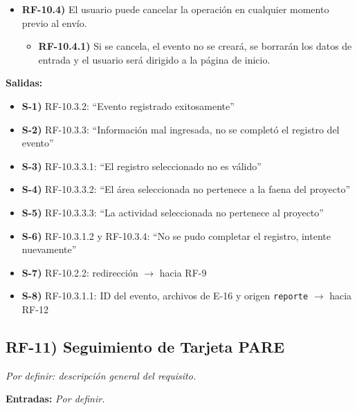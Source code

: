 \begin{itemize}[label={}, leftmargin=1.5em]
\begin{itemize}[label={}, leftmargin=1.5em]
\begin{itemize}[label={}, leftmargin=1.5em]
    \end{itemize}
    \item \textbf{RF-10.3.4)} Si ocurre un error interno al guardar, el sistema revertir\'a la creaci\'on del evento y de sus evidencias (rollback) y notificar\'a: ``No se pudo completar el registro, intente nuevamente''.
  \end{itemize}
  \item \textbf{RF-10.4)} El usuario puede cancelar la operaci\'on en cualquier momento previo al env\'io.
  \begin{itemize}[label={}, leftmargin=1.5em]
    \item \textbf{RF-10.4.1)} Si se cancela, el evento no se crear\'a, se borrar\'an los datos de entrada y el usuario ser\'a dirigido a la p\'agina de inicio.
  \end{itemize}
\end{itemize}

\textbf{Salidas:}
\begin{itemize}[label={}, leftmargin=1.5em]
  \item \textbf{S-1)} RF-10.3.2: ``Evento registrado exitosamente''
  \item \textbf{S-2)} RF-10.3.3: ``Informaci\'on mal ingresada, no se complet\'o el registro del evento''
  \item \textbf{S-3)} RF-10.3.3.1: ``El registro seleccionado no es v\'alido''
  \item \textbf{S-4)} RF-10.3.3.2: ``El \'area seleccionada no pertenece a la faena del proyecto''
  \item \textbf{S-5)} RF-10.3.3.3: ``La actividad seleccionada no pertenece al proyecto''
  \item \textbf{S-6)} RF-10.3.1.2 y RF-10.3.4: ``No se pudo completar el registro, intente nuevamente''
  \item \textbf{S-7)} RF-10.2.2: redirecci\'on $\rightarrow$ hacia RF-9
  \item \textbf{S-8)} RF-10.3.1.1: ID del evento, archivos de E-16 y origen \texttt{reporte} $\rightarrow$ hacia RF-12
\end{itemize}

\subsection*{RF-11) Seguimiento de Tarjeta PARE}
\textit{Por definir: descripci\'on general del requisito.}

\textbf{Entradas:} \textit{Por definir.}

